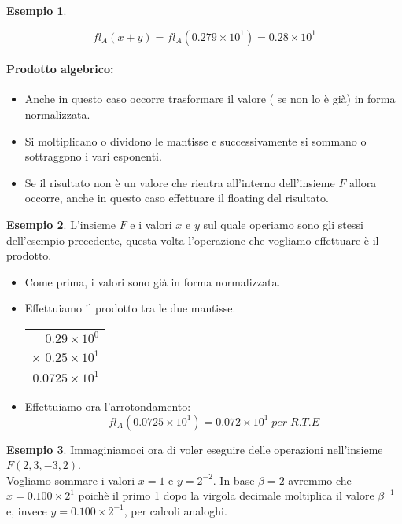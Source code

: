 \documentclass[12pt, a4paper]{book}
\theoremstyle{definition}
\newtheorem{exmp}{Esempio}[section]
\begin{document}
\begin{flushleft}
\begin{exmp}
\begin{itemize}
 	\[ fl_{A}(x+y) = fl_{A}(0.279 \times 10^{1}) = 0.28 \times 10^{1} \]
\end{itemize}
\end{exmp}

\paragraph{Prodotto algebrico: } 
\begin{itemize}
	\item Anche in questo caso occorre trasformare il valore ( se non lo è già) in forma normalizzata. 
	\item Si moltiplicano o dividono le mantisse e successivamente si sommano o sottraggono i vari esponenti. 
	\item Se il risultato non è un valore che rientra all'interno dell'insieme $F$ allora occorre, anche in questo caso effettuare il floating del risultato. 
\end{itemize}

\begin{exmp}
L'insieme $F$ e i valori $x$ e $y$ sul quale operiamo sono gli stessi dell'esempio precedente, questa volta l'operazione che vogliamo effettuare è il prodotto. 
\begin{itemize}
	\item Come prima,  i valori sono già in forma normalizzata.
	\item Effettuiamo il prodotto tra le due mantisse.\\
	\vspace{1em}
	 \begin{tabular}{r}
    		$0.29 \times 10^{0}$ \\ 
    		$\times$ $0.25 \times 10^{1}$  \\ 
     	\hline
     	$0.0725 \times 10^{1}$     
	 \end{tabular}
	\item Effettuiamo ora l'arrotondamento: 
	\[ fl_{A}(0.0725 \times 10^{1}) = 0.072 \times 10^{1} \; per \; R.T.E\]
\end{itemize}
\end{exmp}

\begin{exmp}

Immaginiamoci ora di voler eseguire delle operazioni nell'insieme $F(2,3,-3,2)$.\\ 
Vogliamo sommare i valori $x=1$  e $y=2^{-2}$.  In base $\beta = 2$ avremmo che $x = 0.100 \times 2^{1}$ poichè il primo 1 dopo la virgola decimale moltiplica il valore $\beta^{-1}$ e, invece $y = 0.100 \times 2^{-1}$, per calcoli analoghi. 


\end{exmp}
\end{flushleft}
\end{document}
